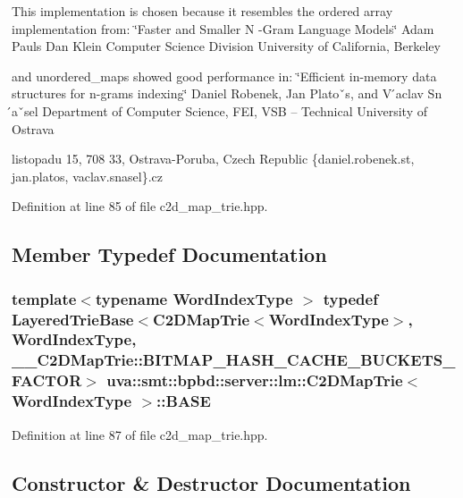 This implementation is chosen because it resembles the ordered array implementation from\+: \char`\"{}\+Faster and Smaller N -\/\+Gram Language Models\char`\"{} Adam Pauls Dan Klein Computer Science Division University of California, Berkeley

and unordered\+\_\+maps showed good performance in\+: \char`\"{}\+Efficient in-\/memory data structures for n-\/grams indexing\char`\"{} Daniel Robenek, Jan Platoˇs, and V ́aclav Sn ́aˇsel Department of Computer Science, F\+E\+I, V\+S\+B – Technical University of Ostrava
\begin{DoxyEnumerate}
\item listopadu 15, 708 33, Ostrava-\/\+Poruba, Czech Republic \{daniel.\+robenek.\+st, jan.\+platos, vaclav.\+snasel\}.cz 
\end{DoxyEnumerate}

Definition at line 85 of file c2d\+\_\+map\+\_\+trie.\+hpp.



\subsection{Member Typedef Documentation}
\hypertarget{classuva_1_1smt_1_1bpbd_1_1server_1_1lm_1_1_c2_d_map_trie_a34e840aa66c6bbf9cc31b8a99738465d}{}
\subsubsection[{B\+A\+S\+E}]{\setlength{\rightskip}{0pt plus 5cm}template$<$typename Word\+Index\+Type $>$ typedef {\bf Layered\+Trie\+Base}$<${\bf C2\+D\+Map\+Trie}$<${\bf Word\+Index\+Type}$>$, {\bf Word\+Index\+Type}, \+\_\+\+\_\+\+C2\+D\+Map\+Trie\+::\+B\+I\+T\+M\+A\+P\+\_\+\+H\+A\+S\+H\+\_\+\+C\+A\+C\+H\+E\+\_\+\+B\+U\+C\+K\+E\+T\+S\+\_\+\+F\+A\+C\+T\+O\+R$>$ {\bf uva\+::smt\+::bpbd\+::server\+::lm\+::\+C2\+D\+Map\+Trie}$<$ {\bf Word\+Index\+Type} $>$\+::{\bf B\+A\+S\+E}}\label{classuva_1_1smt_1_1bpbd_1_1server_1_1lm_1_1_c2_d_map_trie_a34e840aa66c6bbf9cc31b8a99738465d}


Definition at line 87 of file c2d\+\_\+map\+\_\+trie.\+hpp.



\subsection{Constructor \& Destructor Documentation}
\hypertarget{classuva_1_1smt_1_1bpbd_1_1server_1_1lm_1_1_c2_d_map_trie_ae3613f90d14b2614a157b824ee6720e8}{}
